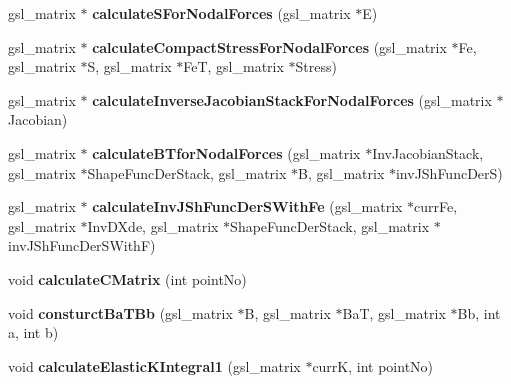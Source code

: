 \begin{DoxyCompactItemize}
\item 
\hypertarget{classShapeBase_ae935864e71abacdb3181d441826bbd39}{}gsl\+\_\+matrix $\ast$ {\bfseries calculate\+S\+For\+Nodal\+Forces} (gsl\+\_\+matrix $\ast$E)\label{classShapeBase_ae935864e71abacdb3181d441826bbd39}

\item 
\hypertarget{classShapeBase_a27269b78017539874f7be9e20973c086}{}gsl\+\_\+matrix $\ast$ {\bfseries calculate\+Compact\+Stress\+For\+Nodal\+Forces} (gsl\+\_\+matrix $\ast$Fe, gsl\+\_\+matrix $\ast$S, gsl\+\_\+matrix $\ast$Fe\+T, gsl\+\_\+matrix $\ast$Stress)\label{classShapeBase_a27269b78017539874f7be9e20973c086}

\item 
\hypertarget{classShapeBase_ac9eaa594e8955de91b2f4b0368c85bae}{}gsl\+\_\+matrix $\ast$ {\bfseries calculate\+Inverse\+Jacobian\+Stack\+For\+Nodal\+Forces} (gsl\+\_\+matrix $\ast$Jacobian)\label{classShapeBase_ac9eaa594e8955de91b2f4b0368c85bae}

\item 
\hypertarget{classShapeBase_ad67919694a1d780e31f6d539781377be}{}gsl\+\_\+matrix $\ast$ {\bfseries calculate\+B\+Tfor\+Nodal\+Forces} (gsl\+\_\+matrix $\ast$Inv\+Jacobian\+Stack, gsl\+\_\+matrix $\ast$Shape\+Func\+Der\+Stack, gsl\+\_\+matrix $\ast$B, gsl\+\_\+matrix $\ast$inv\+J\+Sh\+Func\+Der\+S)\label{classShapeBase_ad67919694a1d780e31f6d539781377be}

\item 
\hypertarget{classShapeBase_aa9f48481aba22e06b07e6ce665ef58fb}{}gsl\+\_\+matrix $\ast$ {\bfseries calculate\+Inv\+J\+Sh\+Func\+Der\+S\+With\+Fe} (gsl\+\_\+matrix $\ast$curr\+Fe, gsl\+\_\+matrix $\ast$Inv\+D\+Xde, gsl\+\_\+matrix $\ast$Shape\+Func\+Der\+Stack, gsl\+\_\+matrix $\ast$inv\+J\+Sh\+Func\+Der\+S\+With\+F)\label{classShapeBase_aa9f48481aba22e06b07e6ce665ef58fb}

\item 
\hypertarget{classShapeBase_ab9e027b7bb9553a0850875c5b94ed4a5}{}void {\bfseries calculate\+C\+Matrix} (int point\+No)\label{classShapeBase_ab9e027b7bb9553a0850875c5b94ed4a5}

\item 
\hypertarget{classShapeBase_a7ae9fb15fa6e3f99173841ea910710c1}{}void {\bfseries consturct\+Ba\+T\+Bb} (gsl\+\_\+matrix $\ast$B, gsl\+\_\+matrix $\ast$Ba\+T, gsl\+\_\+matrix $\ast$Bb, int a, int b)\label{classShapeBase_a7ae9fb15fa6e3f99173841ea910710c1}

\item 
\hypertarget{classShapeBase_af7556d90ad8fe05eb78a5c2967b75f53}{}void {\bfseries calculate\+Elastic\+K\+Integral1} (gsl\+\_\+matrix $\ast$curr\+K, int point\+No)\label{classShapeBase_af7556d90ad8fe05eb78a5c2967b75f53}


\end{DoxyCompactItemize}
